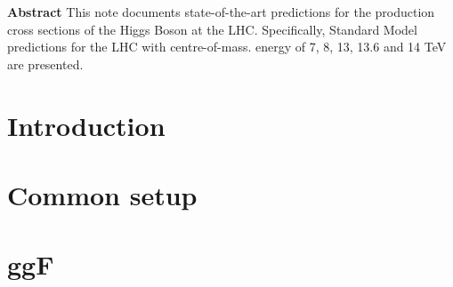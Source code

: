 \documentclass[11pt]{article}
\begin{document}
\begin{titlepage}
\begin{center}



\textbf{}
	\end{center}

        \thispagestyle{empty}




\mbox{}\vspace*{3em}
%
\begin{center}
    \textbf{Abstract}
 This note documents state-of-the-art predictions for the production cross sections of the Higgs Boson at the LHC. 
 Specifically, Standard Model predictions for the LHC with centre-of-mass. energy of 7, 8, 13, 13.6 and 14 TeV are presented.
\end{center}
%
 \end{titlepage}
 \newpage
 \tableofcontents

\section{Introduction}


\section{Common setup}


\section{ggF}

\end{document}
